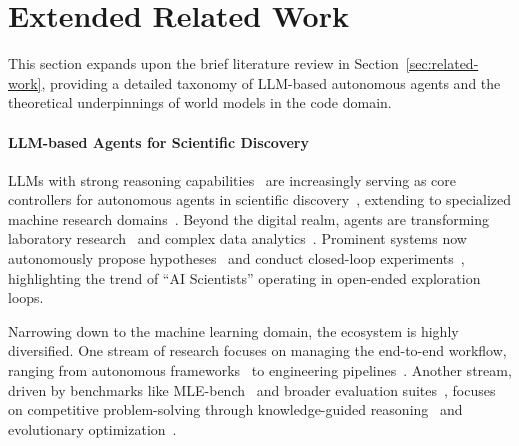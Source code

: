 \vspace{1em}


\section{Extended Related Work}
\label{app:extended_related_work}

This section expands upon the brief literature review in Section~\ref{sec:related-work}, providing a detailed taxonomy of LLM-based autonomous agents and the theoretical underpinnings of world models in the code domain.

\paragraph{LLM-based Agents for Scientific Discovery}
LLMs with strong reasoning capabilities~\cite{qiao-etal-2023-reasoning} are increasingly serving as core controllers for autonomous agents in scientific discovery~\cite{gu2024largelanguagemodelsconstructing,chen2025ai4researchsurveyartificialintelligence}, extending to specialized machine research domains~\cite{toledo2025airesearchagentsmachine, Wen-lin2025}.
Beyond the digital realm, agents are transforming laboratory research~\cite{liu2025alphagomomentmodelarchitecture, li2025mlrcopilotautonomousmachinelearning, Yuxuan2025, schmidgall2025agentlaboratoryusingllm} and complex data analytics~\cite{sun2025agenticdataagenticdataanalytics, zhang2025deepanalyzeagenticlargelanguage}.
Prominent systems now autonomously propose hypotheses~\cite{chai2025scimastergeneralpurposescientificai, yu2025alpharesearchacceleratingnewalgorithm, internagentteam2025internagentagentscientist, novikov2025alphaevolvecodingagentscientific} and conduct closed-loop experiments~\cite{gottweis2025aicoscientist, lange2025shinkaevolveopenendedsampleefficientprogram, yuan2025dolphinmovingclosedloopautoresearch, yu2025researchtownsimulatorhumanresearch, WOS:001446914500004}, highlighting the trend of ``AI Scientists'' operating in open-ended exploration loops.

Narrowing down to the machine learning domain, the ecosystem is highly diversified.
One stream of research focuses on managing the end-to-end workflow, ranging from autonomous frameworks~\cite{nam2025mlestarmachinelearningengineering, yang2025rdagentllmagentframeworkautonomous, qiao2025scalinggeneralistdataanalyticagents, Ze-xi2025} to engineering pipelines~\cite{Fang2025, chi2024selatreesearchenhancedllm, DOI:10.3724/2096-7004.di.2024.0005}.
Another stream, driven by benchmarks like MLE-bench~\cite{chan2025mlebenchevaluatingmachinelearning, huang2024mlagentbenchevaluatinglanguageagents} and broader evaluation suites~\cite{zhang2025mlrcbenchlanguageagentssolve, jing2024dsbench, zhang2024benchmarking, Nathani2025}, focuses on competitive problem-solving through knowledge-guided reasoning~\cite{luo2025executableknowledgegraphsreplicating, ou2025automindadaptiveknowledgeableagent} and evolutionary optimization~\cite{du2025automlgennavigatingfinegrainedoptimization, guo2024dsagentautomateddatascience, li2025fmagent, liu2025mlmasteraiforaiintegrationexploration}.

